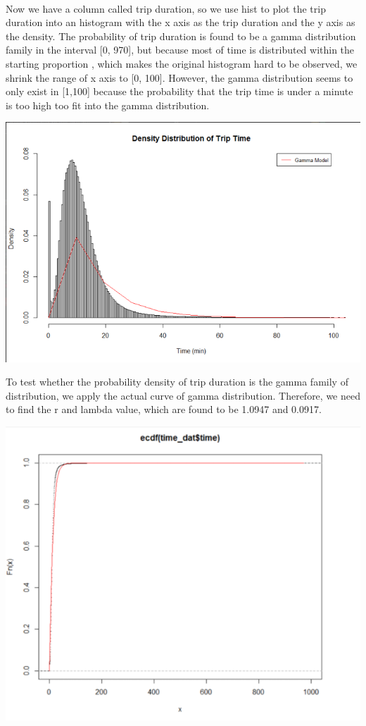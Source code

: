 \documentclass[11pt]{article}
\begin{document}
\\
\par
Now we have a column called trip duration, so we use hist to plot the trip duration into an histogram with the x axis as the trip duration and the y axis as the density. The probability of trip duration is found to be a gamma distribution family in the interval [0, 970], but because most of time is distributed within the starting proportion , which makes the original histogram hard to be observed, we shrink the range of x axis to [0, 100]. However, the gamma distribution seems to only exist in [1,100] because the probability that the trip time is under a minute is too high too fit into the gamma distribution.

\includegraphics[scale = .75]{DensityDistTripTime.png}

\par
To test whether the probability density of trip duration is the gamma family of distribution, we apply the actual curve of gamma distribution. Therefore, we need to find the r and lambda value, which are found to be 1.0947 and 0.0917.

\includegraphics[scale = .75]{ECDF(time_dat$time).png}
\end{document}
